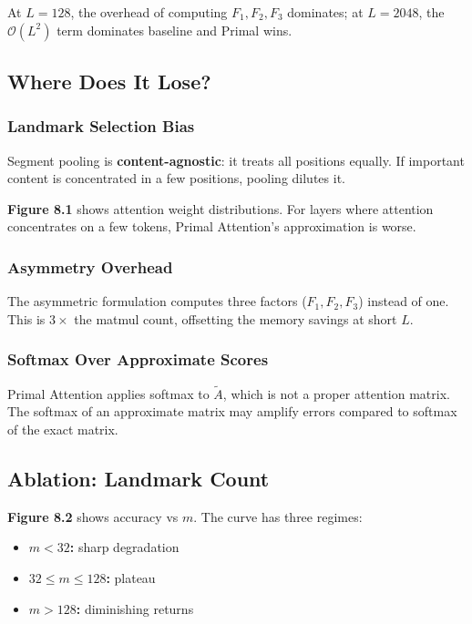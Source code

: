 At $L = 128$, the overhead of computing $F_1, F_2, F_3$ dominates; at 
$L = 2048$, the $\mathcal{O}(L^2)$ term dominates baseline and Primal 
wins.

\subsection{Where Does It Lose?}

\subsubsection{Landmark Selection Bias}

Segment pooling is \textbf{content-agnostic}: it treats all positions equally. 
If important content is concentrated in a few positions, pooling dilutes it.

\textbf{Figure 8.1} shows attention weight distributions. For layers where 
attention concentrates on a few tokens, Primal Attention's approximation 
is worse.

\subsubsection{Asymmetry Overhead}

The asymmetric formulation computes three factors ($F_1, F_2, F_3$) instead 
of one. This is $3\times$ the matmul count, offsetting the memory savings 
at short $L$.

\subsubsection{Softmax Over Approximate Scores}

Primal Attention applies softmax to $\tilde{A}$, which is not a proper 
attention matrix. The softmax of an approximate matrix may amplify errors 
compared to softmax of the exact matrix.

\subsection{Ablation: Landmark Count}

\textbf{Figure 8.2} shows accuracy vs $m$. The curve has three regimes:

\begin{itemize}
\item \textbf{$m < 32$:} sharp degradation
\item \textbf{$32 \le m \le 128$:} plateau
\item \textbf{$m > 128$:} diminishing returns

\end{itemize}
